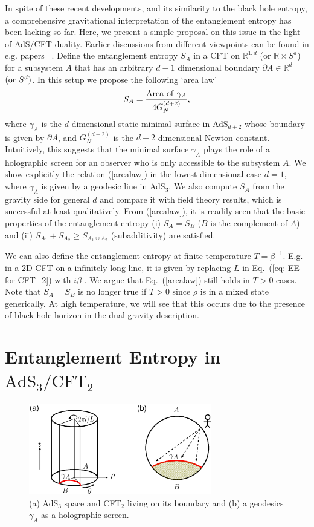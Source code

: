 \documentclass[twocolumn,amsmath,amssymb,nofootinbib,eqsecnum,tighten,prd]{revtex4}
\def\frac#1#2{{#1\over #2}}
\def\de{\partial}
\def\frac#1#2{{#1\over #2}}
\begin{document}
In spite of
these recent developments, and
its similarity to the black hole entropy,
a comprehensive gravitational interpretation of the entanglement
entropy has been lacking so far.  Here,  we present a simple proposal
on this issue in the light of AdS/CFT duality.
Earlier discussions from
different viewpoints can be
found in e.g.  papers \ \cite{HMS,MBH}. Define
the entanglement entropy $S_A$ in
a CFT on
$\mathbb{R}^{1,d}$ (or $\mathbb{R}\times S^{d}$)
for a subsystem $A$ that has an arbitrary $d-1$ dimensional
boundary $\de A\in \mathbb{R}^{d}$ $({\rm or}~ S^{d})$.
In this setup we propose the following `area law'
\begin{equation} S_{A}=\frac{{\rm Area~of}~\gamma_{A}}{4G^{(d+2)}_N},
\label{arealaw}
\end{equation}
where $\gamma_{A}$ is the $d$ dimensional static minimal surface in
AdS$_{d+2}$ whose boundary is given by $\de A$, and $G^{(d+2)}_{N}$
is the $d+2$ dimensional Newton constant. Intuitively, this suggests
that the minimal surface $\gamma_A$ plays the role of a holographic
screen for an observer who is only accessible to the subsystem $A$.
We show explicitly the relation (\ref{arealaw}) in the lowest
dimensional case $d=1$, where $\gamma_{A}$ is given by a geodesic
line in AdS$_3$. We also compute $S_A$ from the gravity side for
general $d$ and compare it with field theory results, which is
successful at least qualitatively. From (\ref{arealaw}), it is
readily seen that the basic properties of the entanglement entropy
(i) $S_A=S_B$ ($B$ is the complement of $A$) and (ii)
$S_{A_1}+S_{A_2}\geq S_{A_1\cup A_2}$ (subadditivity) are satisfied.

We can also define the entanglement entropy at finite temperature $T=\beta^{-1}$.
E.g. in a 2D CFT on a infinitely long line, it is given by
replacing $L$ in Eq.\ (\ref{eq: EE for CFT_2})
with $i\beta$ \cite{Calabrese04}.   We argue that Eq.\ (\ref{arealaw}) still holds
in $T> 0$ cases. Note that $S_A=S_B$ is no longer true if $T> 0$ since
$\rho$ is in a mixed state generically. At high temperature,
we will see that this occurs due to the presence of black hole horizon
in the dual gravity description.

\section{Entanglement Entropy in $\mathrm{AdS}_3/\mathrm{CFT}_2$}

\begin{figure}
\begin{center}
\includegraphics[width=8cm,clip]{holography_ads3_cft2.eps}
\end{center}
\caption{
\label{fig: ads3_cft2.eps}
(a)
AdS$_3$ space and CFT$_2$ living on its boundary
and (b) a geodesics $\gamma_A$ as a
holographic screen.
}
\end{figure}
\end{document}
